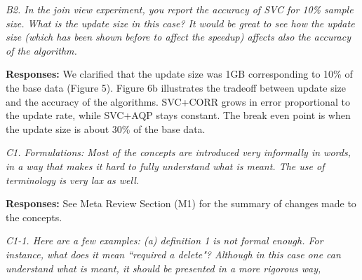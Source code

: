 \vspace{1em}
\emph{B2. In the join view experiment, you report the accuracy of SVC for 10\% sample size. What is the update size in this case? It would be great to see how the update size (which has been shown before to affect the speedup) affects also the accuracy of the algorithm.}

\vspace{.25em}

{\bf Responses:} We clarified that the update size was 1GB corresponding to 10\% of the base data (Figure 5). Figure 6b illustrates the tradeoff between update size and the accuracy of the algorithms. SVC+CORR grows in error proportional to the update rate, while SVC+AQP stays constant. The break even point is when the update size is about 30\% of the base data. 

\vspace{1em}
\emph{C1. Formulations: Most of the concepts are introduced very informally in words, in a way that makes it hard to fully understand what is meant. The use of terminology is very lax as well. }

\vspace{.25em}

{\bf Responses:} See Meta Review Section (M1) for the summary of changes made to the concepts.

\vspace{1em}
\emph{C1-1. Here are a few examples: (a) definition 1 is not formal enough. For instance, what does it mean ``required a delete"? Although in this case one can understand what is meant, it should be presented in a more rigorous way,} 

\vspace{.25em}

